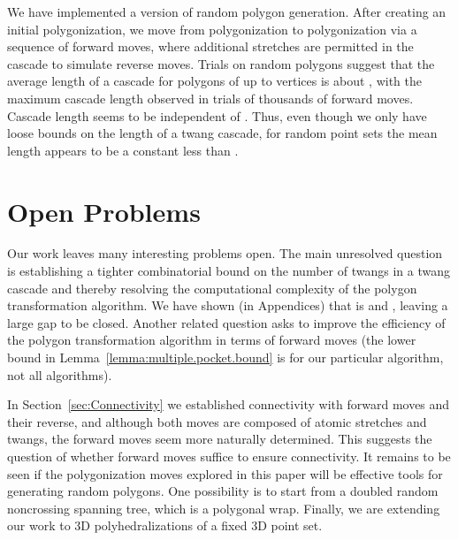 \pdfoutput=1  \documentclass{article}
\newcommand{\seclab}[1]{\label{sec:#1}}
\newcommand{\lemref}[1]{\ref{lemma:#1}}
\newcommand{\secref}[1]{\ref{sec:#1}}
\begin{document}
We have implemented a version of random polygon generation. After
creating an initial polygonization, we move from polygonization to
polygonization via a sequence of forward moves, where additional
stretches are permitted in the cascade to simulate reverse moves.
Trials on random polygons suggest that the average length of a
cascade for polygons of up to  vertices is about , with
 the maximum cascade length observed in
trials of thousands of forward moves. 
Cascade length seems to be independent of .
Thus, even though 
we only have loose bounds on the length of a twang cascade,
for random point sets the mean length appears to be a constant less than .


\vspace{-0.8em}
\section{Open Problems}
\vspace{-0.2em} 
\seclab{Open.Problems} Our work leaves many interesting problems
open. 
The main unresolved question is establishing a tighter combinatorial
bound on the number of twangs  in a twang cascade and thereby
resolving the computational complexity of the polygon transformation
algorithm.  We have shown (in Appendices)
that  is  and ,
leaving a large gap to be closed.
Another related question asks to improve the efficiency of
the polygon transformation algorithm in terms of forward moves (the
lower bound in Lemma~\lemref{multiple.pocket.bound} is for our
particular algorithm, not all algorithms).

In Section~\secref{Connectivity} we established connectivity with
forward moves and their reverse, and although both moves are
composed of atomic stretches and twangs, the forward moves seem more
naturally determined. 
This suggests the question of
whether forward moves
suffice to ensure
connectivity.
It remains to be seen if the polygonization moves explored in this
paper will be effective tools for generating random polygons.
One possibility is to start from a doubled random noncrossing spanning
tree, which is a polygonal wrap.
Finally, we are extending our work to 3D 
polyhedralizations of a fixed 3D point set.
\end{document}
